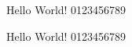 \documentclass{article}
\def\Hello{Hello World! 0123456789}
\begin{document}
 

\Hello

{\myfont \Hello}
\end{document}
